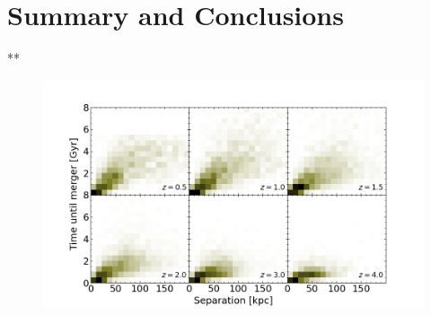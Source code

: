 \documentclass[twocolumn]{aastex631}
\begin{document}
\section{Summary and Conclusions}











** 
\appendix
\begin{figure}[htb]
    \centering
    \includegraphics[width=\textwidth]{plots/bet-on-it/3_Timevsseplow-2d.png}
    \caption{}
\end{figure}
\end{document}
